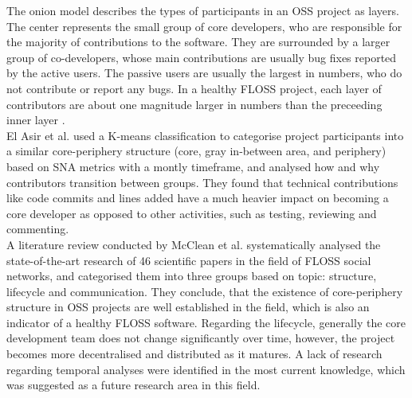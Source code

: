 The onion model describes the types of participants in an OSS project as layers. The center represents the small group of core developers, who are responsible for the majority of contributions to the software. They are surrounded by a larger group of co-developers, whose main contributions are usually bug fixes reported by the active users. The passive users are usually the largest in numbers, who do not contribute or report any bugs. In a healthy FLOSS project, each layer of contributors are about one magnitude larger in numbers than the preceeding inner layer \cite{mockusTwoCaseStudies2002}. \\

El Asir et al. \cite{elasriPeripheryCoreTemporal2017} used a K-means classification to categorise project participants into a similar core-periphery structure (core, gray in-between area, and periphery) based on SNA metrics with a montly timeframe, and analysed how and why contributors transition between groups. They found that technical contributions like code commits and lines added have a much heavier impact on becoming a core developer as opposed to other activities, such as testing, reviewing and commenting. \\

A literature review conducted by McClean et al. \cite{mccleanSocialNetworkAnalysis2021} systematically analysed the state-of-the-art research of 46 scientific papers in the field of FLOSS social networks, and categorised them into three groups based on topic: structure, lifecycle and communication. They conclude, that the existence of core-periphery structure in OSS projects are well established in the field, which is also an indicator of a healthy FLOSS software. Regarding the lifecycle, generally the core development team does not change significantly over time, however, the project becomes more decentralised and distributed as it matures. A lack of research regarding temporal analyses were identified in the most current knowledge, which was suggested as a future research area in this field. \\



